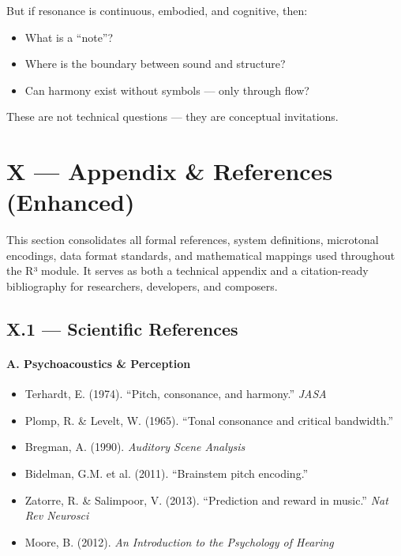 But if resonance is continuous, embodied, and cognitive, then:

\begin{itemize}
    \item What is a “note”?
    \item Where is the boundary between sound and structure?
    \item Can harmony exist without symbols — only through flow?
\end{itemize}

These are not technical questions — they are conceptual invitations.

\section*{X — Appendix \& References (Enhanced)}

This section consolidates all formal references, system definitions, microtonal encodings, data format standards, and mathematical mappings used throughout the R³ module. It serves as both a technical appendix and a citation-ready bibliography for researchers, developers, and composers.

\subsection*{X.1 — Scientific References}

\paragraph{A. Psychoacoustics \& Perception}
\begin{itemize}
    \item Terhardt, E. (1974). “Pitch, consonance, and harmony.” \textit{JASA}
    \item Plomp, R. \& Levelt, W. (1965). “Tonal consonance and critical bandwidth.”
    \item Bregman, A. (1990). \textit{Auditory Scene Analysis}
    \item Bidelman, G.M. et al. (2011). “Brainstem pitch encoding.”
    \item Zatorre, R. \& Salimpoor, V. (2013). “Prediction and reward in music.” \textit{Nat Rev Neurosci}
    \item Moore, B. (2012). \textit{An Introduction to the Psychology of Hearing}
\end{itemize}

